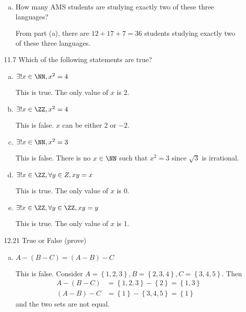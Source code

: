 \documentclass{article}
\begin{document}
\begin{itemize}
\begin{enumerate}[(a)]
			\item How many AMS students are studying exactly two of these three languages?
				\begin{soln}
					From part (a), there are $12+17+7=\boxed{36}$ students studying exactly two of these three languages.
				\end{soln}
				
		\end{enumerate}

	\item[11.7] Which of the following statements are true?
		\begin{enumerate}[a.]
			\item $\exists! x\in \NN, x^2=4$
				\begin{answer*}
					This is true. The only value of $x$ is 2.
				\end{answer*}

			\item $\exists! x\in\ZZ, x^2=4$
				\begin{answer*}
					This is false. $x$ can be either 2 or $-2.$
				\end{answer*}

			\item $\exists! x\in\NN, x^2=3$
				\begin{answer*}
					This is false. There is no $x\in\NN$ such that $x^2=3$ since $\sqrt{3}$ is irrational.
				\end{answer*}

			\item $\exists! x\in\ZZ, \forall y\in Z, xy=x$
				\begin{answer*}
					This is true. The only value of $x$ is 0.
				\end{answer*}

			\item $\exists! x\in\ZZ, \forall y\in \ZZ, xy=y$
				\begin{answer*}
					This is true. The only value of $x$ is 1.
				\end{answer*}
				
		\end{enumerate}

		\newpage
	\item[12.21] True or False (prove)
		\begin{enumerate}[a.]
			\item $A-(B-C)=(A-B)-C$
				\begin{soln}
					This is false. Consider $A=\left\{ 1, 2, 3 \right\}, B=\left\{ 2, 3, 4 \right\}, C=\left\{ 3, 4, 5 \right\}.$ Then
					\begin{align*}
						A-(B-C) &= \left\{ 1, 2, 3 \right\}-\left\{ 2 \right\} = \left\{ 1, 3 \right\} \\
						(A-B)-C &= \left\{ 1 \right\} - \left\{ 3, 4, 5 \right\} = \left\{ 1 \right\}
					\end{align*}
					and the two sets are not equal.
				\end{soln}


\end{enumerate}
\end{itemize}
\end{document}
